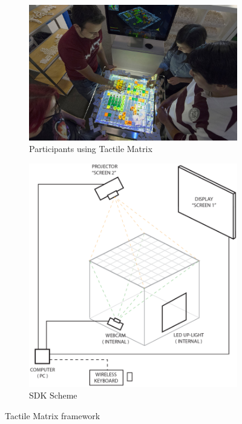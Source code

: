 \begin{figure}[h]
    \centering
    \begin{subfigure}[t]{0.49\linewidth}
        \centering
        \includegraphics[width=\linewidth]{figures/tactile.jpg}
        \caption{Participants using Tactile Matrix \cite{winderTactileUsers}}
    \end{subfigure}
    \begin{subfigure}[t]{0.49\linewidth}
        \centering
        \includegraphics[width=0.6\linewidth]{figures/tactilematrixelectronics.png}
        \caption{SDK Scheme \cite{winderTactileScheme}}
    \end{subfigure}
    \caption{Tactile Matrix framework}
    \label{fig:tactilematrix}
\end{figure}

